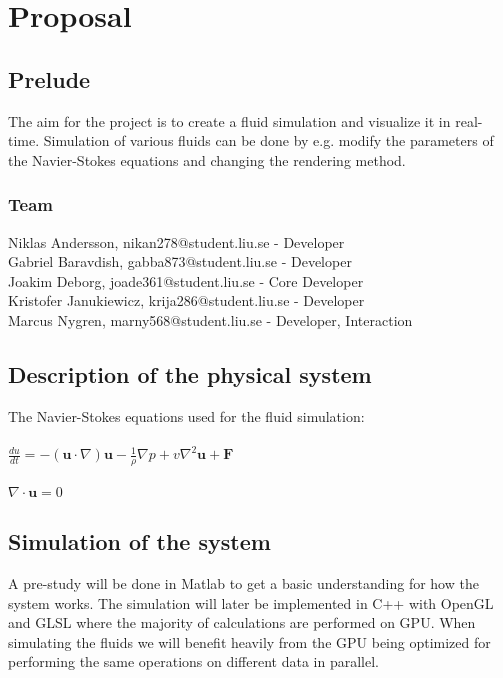 \documentclass[a4paper,12pt,twoside,swedish]{report}
\begin{document}
\pagestyle{plain}

\setcounter{page}{1}

\chapter{Proposal}

\section{Prelude}
The aim for the project is to create a fluid simulation and visualize it in real-time. Simulation of various fluids can be done by e.g. modify the parameters of the Navier-Stokes equations and changing the rendering method.

 \subsection{Team}
Niklas Andersson, nikan278@student.liu.se - Developer\\
Gabriel Baravdish, gabba873@student.liu.se - Developer\\
Joakim Deborg, joade361@student.liu.se - Core Developer\\
Kristofer Janukiewicz, krija286@student.liu.se - Developer\\
Marcus Nygren, marny568@student.liu.se - Developer, Interaction

\section{Description of the physical system}
The Navier-Stokes equations used for the fluid simulation:\\\\
\(\frac{du}{dt} = - (\textbf{u}\cdot{\nabla})\textbf{u} - \frac{1}{\rho}\nabla p + v \nabla^2 \textbf{u} + \textbf{F}\) \\\\
\(\nabla \cdot \textbf{u} = 0 \)

\section{Simulation of the system}
A pre-study will be done in Matlab to get a basic understanding for how the system works. The simulation will later be implemented in C++ with OpenGL and GLSL where the majority of calculations are performed on GPU. When simulating the fluids we will benefit heavily from the GPU being optimized for performing the same operations on different data in parallel.
\end{document}
